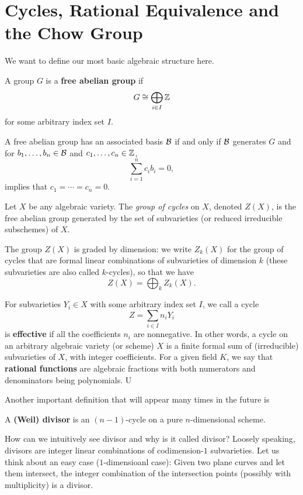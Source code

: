 \section{Cycles, Rational Equivalence and the Chow Group}
\label{sec:cycles-rational-equivalence-chow-group}
We want to define our most basic algebraic structure here.
	\begin{definition}
		A group $G$ is a \textbf{free abelian group}
		if 
		\[
		G \cong \bigoplus\limits_{i \in I} \mathbb{Z}
		\]
		for some arbitrary index set $I$. 
	\end{definition}
	A free abelian group has an associated basis $\mathcal{B}$ if and only if
	$\mathcal{B}$ generates $G$ and for $b_1, \ldots, b_n \in \mathcal{B}$ 
	and $c_1, \ldots, c_n \in \mathbb{Z}$,  
	\[
	\sum\limits_{i=1}^n c_i b_i = 0,
	\]
	implies that $c_1 = \cdots = c_n = 0$. 
	

	\begin{definition}
		Let $X$ be any algebraic variety. 
		The \emph{group of cycles} on $X$, denoted $Z(X)$,
		is the free abelian group generated by the set of subvarieties
		(or reduced irreducible subschemes) of $X$.
		
		The group $Z(X)$ is graded by dimension:
		we write $Z_k(X)$ for the group of cycles 
		that are formal linear combinations of 
		subvarieties of dimension $k$
		(these subvarieties are also called $k$-cycles),
		so that we have
		\[
		Z(X) = \bigoplus_k Z_k(X).
		\]
	\end{definition}

For subvarieties $Y_i \in X$ with some arbitrary index set $I$,
we call a cycle 
	\[
	Z = \sum\limits_{i \in I} n_i Y_i
	\] is \textbf{effective} if all the coefficients $n_i$ are nonnegative. 
In other words, a cycle on an arbitrary algebraic variety (or scheme) $X$
is a finite formal sum of (irreducible) subvarieties of $X$,
with integer coefficients.
For a given field $K$, we say that \textbf{rational functions}
are algebraic fractions with both numerators and denominators 
being polynomials.
U 

Another important definition that will appear many times in the future is 
	\begin{definition}
		A \textbf{(Weil) divisor} is an $(n-1)$-cycle on a pure $n$-dimensional 
		scheme. 
	\end{definition}
How can we intuitively see divisor and why is it called divisor? 
Loosely speaking, divisors are integer linear combinations of 
codimension-$1$ subvarieties.
Let us think about an easy case ($1$-dimensioanl case): 
Given two plane curves and let them intersect,
the integer combination of the intersection points (possibly with multiplicity) 
is a divisor. 

